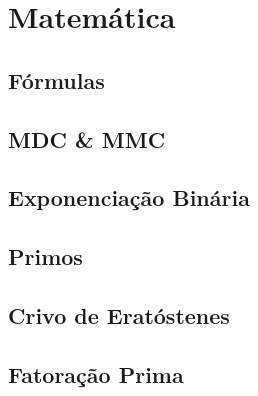 \section{Matemática}

\subsection{Fórmulas}


\subsection{MDC \& MMC}


\subsection{Exponenciação Binária}


% 

\subsection{Primos}


\subsection{Crivo de Eratóstenes}


\subsection{Fatoração Prima}


% 

% 

